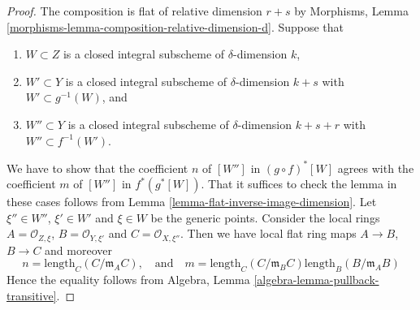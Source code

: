 \documentclass[10pt,a4paper]{amsart}
\theoremstyle{plain}
\theoremstyle{definition}
\theoremstyle{remark}
\numberwithin{equation}{subsection}
\begin{document}
\begin{proof}
The composition is flat of relative dimension $r + s$ by
Morphisms, Lemma \ref{morphisms-lemma-composition-relative-dimension-d}.
Suppose that
\begin{enumerate}
\item $W \subset Z$ is a closed integral subscheme of $\delta$-dimension $k$,
\item $W' \subset Y$ is a closed integral subscheme of $\delta$-dimension
$k + s$ with $W' \subset g^{-1}(W)$, and
\item $W'' \subset Y$ is a closed integral subscheme of $\delta$-dimension
$k + s + r$ with $W'' \subset f^{-1}(W')$.
\end{enumerate}
We have to show that the coefficient $n$ of $[W'']$ in
$(g \circ f)^*[W]$ agrees with the coefficient $m$ of
$[W'']$ in $f^*(g^*[W])$. That it suffices to check the lemma in these
cases follows from Lemma \ref{lemma-flat-inverse-image-dimension}.
Let $\xi'' \in W''$, $\xi' \in W'$
and $\xi \in W$ be the generic points. Consider the local rings
$A = \mathcal{O}_{Z, \xi}$, $B = \mathcal{O}_{Y, \xi'}$
and $C = \mathcal{O}_{X, \xi''}$. Then we have local flat ring maps
$A \to B$, $B \to C$ and moreover
$$
n = \text{length}_C(C/\mathfrak m_AC),
\quad
\text{and}
\quad
m = \text{length}_C(C/\mathfrak m_BC) \text{length}_B(B/\mathfrak m_AB)
$$
Hence the equality follows from
Algebra, Lemma \ref{algebra-lemma-pullback-transitive}.
\end{proof}
\end{document}
